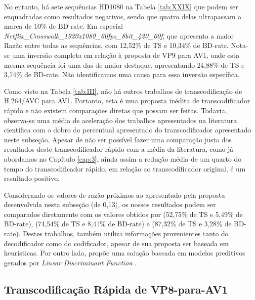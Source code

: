 No entanto, há sete sequências HD1080 na Tabela \ref{tab:XXIX} que podem ser enquadradas como resultados negativos, sendo que quatro delas ultrapassam a marca de 10\% de BD-rate. Em especial \textit{Netflix\_Crosswalk\_1920x1080\_60fps\_8bit\_420\_60f}, que apresenta a maior Razão entre todas as sequências, com 12,52\% de TS e 10,34\% de BD-rate. Nota-se uma inversão completa em relação à proposta de VP9 para AV1, onde esta mesma sequência foi uma das de maior destaque, apresentando 24,88\% de TS e 3,74\% de BD-rate. Não identificamos uma causa para essa inversão específica.

Como visto na Tabela \ref{tab:III}, não há outros trabalhos de transcodificação de H.264/AVC para AV1. Portanto, esta é uma proposta inédita de transcodificador rápido e não existem comparações diretas que possam ser feitas. Todavia, observa-se uma média de aceleração dos trabalhos apresentados na literatura científica com o dobro do percentual apresentado do transcodificador apresentado neste subseção. Apesar de não ser possível fazer uma comparação justa dos resultados deste transcodificador rápido com a média da literatura, como já abordamos no Capítulo \ref{cap:3}, ainda assim a redução média de um quarto do tempo do transcodificador rápido, em relação ao transcodificador original, é um resultado positivo.

Considerando os valores de razão próximos ao apresentado pela proposta desenvolvida nesta subseção (de 0,13), os nossos resultados podem ser comparados diretamente com os valores obtidos por \citet{bib:peixoto_2012} (52,75\% de TS e 5,49\% de BD-rate), \citet{bib:peixoto2_2014} (74,54\% de TS e 8,41\% de BD-rate) e \citet{bib:franche_2017} (87,32\% de TS e 3,28\% de BD-rate). Destes trabalhos, \citet{bib:franche_2017} também utiliza informações provenientes tanto do decodificador como do codificador, apesar de sua proposta ser baseada em heurísticas. Por outro lado, \citet{bib:peixoto2_2014} propõe uma solução baseada em modelos preditivos gerados por \textit{Linear Discriminant Function} \cite{bib:shumway_1974}.

\subsection{Transcodificação Rápida de VP8-para-AV1}
\label{cap:7.5.3}

